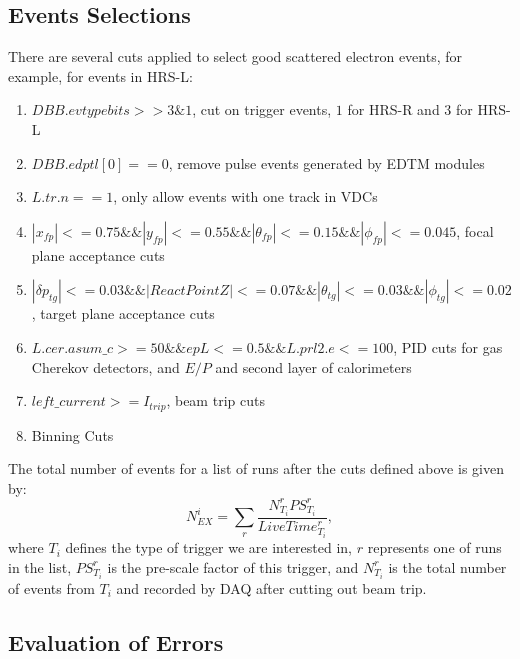\documentclass[a4paper,18.pt]{article}
\begin{document}
\subsection{Events Selections}
  
There are several cuts applied to select good scattered electron events, for example, for events in HRS-L:

\begin{enumerate}
\item \textbf{$DBB.evtypebits>>3\&1$}, cut on trigger events, $1$ for HRS-R and $3$ for HRS-L\\
\item \textbf{$DBB.edptl[0]==0$}, remove pulse events generated by EDTM modules
\item \textbf{$L.tr.n==1$}, only allow events with one track in VDCs \\
\item \textbf{$|x_{fp}|<=0.75 \&\& |y_{fp}|<=0.55 \&\& |\theta_{fp}|<=0.15 \&\& |\phi_{fp}|<=0.045$}, focal plane acceptance cuts \\
\item \textbf{$|\delta p_{tg}|<=0.03 \&\& |ReactPointZ|<=0.07 \&\& |\theta_{tg}|<=0.03 \&\& |\phi_{tg}|<=0.02$}, target plane acceptance cuts \\
\item \textbf{$L.cer.asum\_c>=50 \&\& epL<=0.5 \&\& L.prl2.e<=100$}, PID cuts for gas Cherekov detectors, and $E/P$ and second layer of calorimeters \\
\item \textbf{$left\_current >= I_{trip}$}, beam trip cuts \\
\item Binning Cuts
\end{enumerate}

The total number of events for a list of runs after the cuts defined above is given by:
\begin{equation}
  N_{EX}^{i} = \sum_{r} \frac{N_{T_{i}}^{r} PS_{T_{i}}^{r}}{LiveTime_{T_{i}}^{r}},
\end{equation}
where $T_{i}$ defines the type of trigger we are interested in, $r$ represents one of runs in the list, $PS_{T_{i}}^{r}$ is the pre-scale factor of this trigger, and $N_{T_{i}}^{r}$ is the total number of events from $T_{i}$ and recorded by DAQ after cutting out beam trip. 

\subsection{Evaluation of Errors}
\end{document}
